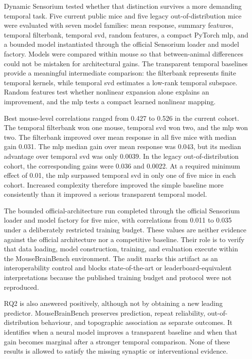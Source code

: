 Dynamic Sensorium tested whether that distinction survives a more demanding
temporal task. Five current public mice and five legacy out-of-distribution mice
were evaluated with seven model families: mean response, summary features,
temporal filterbank, temporal \ac{svd}, random features, a compact PyTorch
\ac{mlp}, and a bounded model
instantiated through the official Sensorium loader and model factory. Models
were compared within mouse so that between-animal differences could not be
mistaken for architectural gains. The transparent temporal baselines provide a
meaningful intermediate comparison: the filterbank represents finite temporal
kernels, while temporal \acs{svd} estimates a low-rank temporal subspace. Random
features test whether nonlinear expansion alone explains an improvement, and
the \acs{mlp} tests a compact learned nonlinear mapping.

Best mouse-level correlations ranged from 0.427 to 0.526 in the current cohort.
The temporal filterbank won one mouse, temporal \acs{svd} won two, and the \acs{mlp} won
two. The filterbank improved over mean response in all five mice with median
gain 0.031. The \acs{mlp} median gain over mean response was 0.043, but its median
advantage over temporal \acs{svd} was only 0.0039. In the legacy out-of-distribution
cohort, the corresponding gains were 0.036 and 0.0022. At a required minimum
effect of 0.01, the \acs{mlp} surpassed temporal \acs{svd} in only one of five mice in each
cohort. Increased complexity therefore improved the simple baseline more
consistently than it improved a serious transparent temporal model.

The bounded official-architecture run completed through the official Sensorium
loader and model factory for five mice, with correlations from 0.011 to 0.035
under a deliberately restricted training budget. These values are neither
evidence against the official architecture nor a competitive baseline. Their
role is to verify that data loading, model construction, training, and
evaluation execute within the MouseBrainBench environment. The audit marks this
artifact as an interoperability control and blocks state-of-the-art or
leaderboard-equivalent interpretations because the published training budget
and protocol were not reproduced.

RQ2 is also answered positively, although not by obtaining a new leading
predictor. MouseBrainBench preserves prediction, repeat reliability,
out-of-distribution behaviour, and topographic association as separate outcomes.
It identifies when a neural model improves a transparent baseline and when that
gain becomes marginal after a stronger temporal comparison. None of these
results is allowed to satisfy the missing synaptic or interventional evidence.

